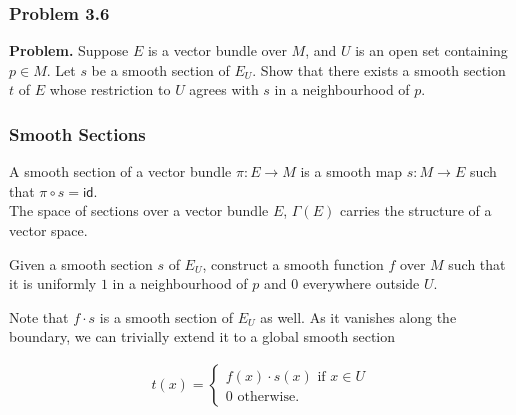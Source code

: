 \begin{frame}
    \frametitle{Problem 3.6}

    \textbf{Problem. } Suppose \(E\) is a vector bundle over \(M\), and \(U\) is
    an open set containing \(p \in M\). Let \(s\) be a smooth section of
    \(E_U\). Show that there exists a smooth section \(t\) of \(E\) whose
    restriction to \(U\) agrees with \(s\) in a neighbourhood of \(p\).

\end{frame}


\begin{frame}
    \frametitle{Smooth Sections}

    A smooth section of a vector bundle \(\pi: E \to M\) is a smooth map \(s: M
    \to E\) such that \(\pi \circ s = \textsf{id}\). \\

    The space of sections over a vector bundle \(E\), \(\Gamma(E)\) carries the
    structure of a vector space.

\end{frame}

\begin{frame}
    
    Given a smooth section \(s\) of \(E_U\), construct a smooth function \(f\)
    over \(M\) such that it is uniformly \(1\) in a neighbourhood of \(p\) and
    \(0\) everywhere outside \(U\).  \pause

    Note that \(f\cdot s\) is a smooth section of \(E_U\) as well. As it
    vanishes along the boundary, we can trivially extend it to a global smooth
    section \pause

    \begin{gather}
        t(x) = \begin{cases}
            f(x)\cdot s(x) \text{ if } x \in U \\
            0 \text{ otherwise.}
        \end{cases}
    \end{gather}

\end{frame}


